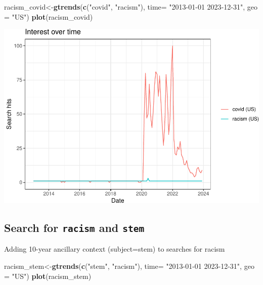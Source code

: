 \documentclass[
]{article}
\newenvironment{Shaded}{\begin{snugshade}}{\end{snugshade}}
\newcommand{\AttributeTok}[1]{\textcolor[rgb]{0.13,0.29,0.53}{#1}}
\newcommand{\FunctionTok}[1]{\textcolor[rgb]{0.13,0.29,0.53}{\textbf{#1}}}
\newcommand{\NormalTok}[1]{#1}
\newcommand{\OtherTok}[1]{\textcolor[rgb]{0.56,0.35,0.01}{#1}}
\newcommand{\StringTok}[1]{\textcolor[rgb]{0.31,0.60,0.02}{#1}}
\begin{document}
\begin{Shaded}
\begin{Highlighting}[]
\NormalTok{racism\_covid}\OtherTok{\textless{}{-}}\FunctionTok{gtrends}\NormalTok{(}\FunctionTok{c}\NormalTok{(}\StringTok{"covid"}\NormalTok{, }\StringTok{"racism"}\NormalTok{), }\AttributeTok{time=} \StringTok{"2013{-}01{-}01 2023{-}12{-}31"}\NormalTok{, }\AttributeTok{geo =} \StringTok{"US"}\NormalTok{)}
\FunctionTok{plot}\NormalTok{(racism\_covid)}
\end{Highlighting}
\end{Shaded}

\includegraphics{overview-keyword-racism_files/figure-latex/unnamed-chunk-4-1.pdf}

\hypertarget{search-for-racism-and-stem}{%
\subsection{\texorpdfstring{Search for \texttt{racism} and
\texttt{stem}}{Search for racism and stem}}\label{search-for-racism-and-stem}}

Adding 10-year ancillary context (subject=stem) to searches for racism

\begin{Shaded}
\begin{Highlighting}[]
\NormalTok{racism\_stem}\OtherTok{\textless{}{-}}\FunctionTok{gtrends}\NormalTok{(}\FunctionTok{c}\NormalTok{(}\StringTok{"stem"}\NormalTok{, }\StringTok{"racism"}\NormalTok{), }\AttributeTok{time=} \StringTok{"2013{-}01{-}01 2023{-}12{-}31"}\NormalTok{, }\AttributeTok{geo =} \StringTok{"US"}\NormalTok{)}
\FunctionTok{plot}\NormalTok{(racism\_stem)}
\end{Highlighting}
\end{Shaded}
\end{document}
